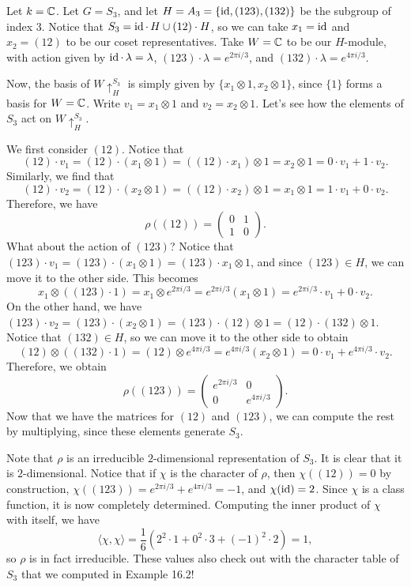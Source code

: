 \begin{exmp}{}
    Let $k = \mathbb{C}$. Let $G = S_3$, and let $H = A_3 = \{\operatorname{id}, (123), (132)\}$ be the 
    subgroup of index $3$. Notice that $S_3 = \operatorname{id} \cdot\,H \cup (12) \cdot H$, 
    so we can take $x_1 = \operatorname{id}$ and $x_2 = (12)$ to be our coset representatives. 
    Take $W = \mathbb{C}$ to be our $H$-module, with action given by 
    $\operatorname{id} \cdot\,\lambda = \lambda$, $(123) \cdot \lambda = e^{2\pi i/3}$, 
    and $(132) \cdot \lambda = e^{4\pi i/3}$.

    Now, the basis of $W \uparrow_H^{S_3}$ is simply given by $\{x_1 \otimes 1, 
    x_2 \otimes 1\}$, since $\{1\}$ forms a basis for $W = \mathbb{C}$. Write 
    $v_1 = x_1 \otimes 1$ and $v_2 = x_2 \otimes 1$. Let's see how the elements 
    of $S_3$ act on $W \uparrow_H^{S_3}$. 

    We first consider $(12)$. Notice that 
    \[ (12) \cdot v_1 = (12) \cdot (x_1 \otimes 1) = 
    ((12) \cdot x_1) \otimes 1 = x_2 \otimes 1 = 0 \cdot v_1 + 1 \cdot v_2. \] 
    Similarly, we find that 
    \[ (12) \cdot v_2 = (12) \cdot (x_2 \otimes 1) = 
    ((12) \cdot x_2) \otimes 1 = x_1 \otimes 1 = 1 \cdot v_1 + 0 \cdot v_2. \] 
    Therefore, we have 
    \[ \rho((12)) = \begin{pmatrix}
        0 & 1 \\ 
        1 & 0 
    \end{pmatrix}. \] 
    \newpage 
    What about the action of $(123)$? Notice that $(123) \cdot v_1 = 
    (123) \cdot (x_1 \otimes 1) = (123) \cdot x_1 \otimes 1$, and since 
    $(123) \in H$, we can move it to the other side. This becomes 
    \[ x_1 \otimes ((123) \cdot 1) = x_1 \otimes e^{2\pi i/3} = 
    e^{2\pi i/3} (x_1 \otimes 1) = e^{2\pi i/3} \cdot v_1 + 0 \cdot v_2. \] 
    On the other hand, we have $(123) \cdot v_2 = (123) \cdot (x_2 \otimes 1) 
    = (123) \cdot (12) \otimes 1 = (12) \cdot (132) \otimes 1$. Notice that 
    $(132) \in H$, so we can move it to the other side to obtain 
    \[ (12) \otimes ((132) \cdot 1) = (12) \otimes e^{4\pi i/3} 
    = e^{4\pi i/3} (x_2 \otimes 1) = 0 \cdot v_1 + e^{4\pi i/3} \cdot v_2. \] 
    Therefore, we obtain 
    \[ \rho((123)) = \begin{pmatrix}
        e^{2\pi i/3} & 0 \\ 
        0 & e^{4\pi i/3}
    \end{pmatrix}. \] 
    Now that we have the matrices for $(12)$ and $(123)$, we can compute the 
    rest by multiplying, since these elements generate $S_3$. 

    Note that $\rho$ is an irreducible $2$-dimensional representation of $S_3$. 
    It is clear that it is $2$-dimensional. Notice that if $\chi$ is the 
    character of $\rho$, then $\chi((12)) = 0$ by construction, 
    $\chi((123)) = e^{2\pi i/3} + e^{4\pi i/3} = -1$, and $\chi(\operatorname{id}) = 2$. Since 
    $\chi$ is a class function, it is now completely determined. Computing the 
    inner product of $\chi$ with itself, we have 
    \[ \langle \chi, \chi \rangle = \frac{1}{6}(2^2 \cdot 1 + 0^2 \cdot 3 
    + (-1)^2 \cdot 2) = 1, \] 
    so $\rho$ is in fact irreducible. These values also check out with the 
    character table of $S_3$ that we computed in Example 16.2!
\end{exmp}
